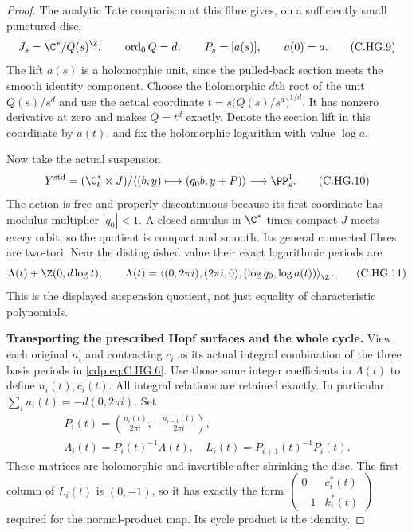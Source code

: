 \begin{proof}
The analytic Tate comparison at this fibre
gives, on a sufficiently small punctured disc,
\[
       J_s=\C^*/Q(s)^{\Z},\qquad
       \operatorname{ord}_0Q=d,\qquad P_s=[a(s)],
       \qquad a(0)=a.
\tag{C.HG.9}\label{cdp:eq:C.HG.9}
\]
The lift $a(s)$ is a holomorphic unit, since
the pulled-back section meets the smooth
identity component. Choose the holomorphic
$d$th root of the unit $Q(s)/s^d$ and use the
actual coordinate
$t=s\bigl(Q(s)/s^d\bigr)^{1/d}$.
It has nonzero derivative at zero and makes
$Q=t^d$ exactly. Denote the section lift in
this coordinate by $a(t)$, and fix the
holomorphic logarithm with value $\log a$.

Now take the actual suspension
\[
 Y^{\rm std}=
  (\C^*_b\times J)/
      \langle(b,y)\longmapsto(q_0 b,y+P)\rangle
          \longrightarrow\PP^1_s .
\tag{C.HG.10}\label{cdp:eq:C.HG.10}
\]
The action is free and properly discontinuous
because its first coordinate has modulus
multiplier $|q_0|<1$. A closed annulus in
$\C^*$ times compact $J$ meets every orbit,
so the quotient is compact and smooth.
Its general connected fibres are two-tori.
Near the distinguished value their exact
logarithmic periods are
\[
 \Lambda(t)+\Z(0,d\log t),\qquad
 \Lambda(t)=
 \left\langle(0,2\pi i),(2\pi i,0),
                  (\log q_0,\log a(t))\right\rangle_{\Z}.
\tag{C.HG.11}\label{cdp:eq:C.HG.11}
\]
This is the displayed suspension quotient,
not just equality of characteristic polynomials.

\par\medskip\noindent\textbf{Transporting the prescribed Hopf surfaces and the whole cycle.}
View each original $n_i$ and contracting
$c_i$ as its actual integral combination
of the three basis periods in \eqref{cdp:eq:C.HG.6}.
Use those same integer coefficients in
$\Lambda(t)$ to define $n_i(t),c_i(t)$.
All integral relations are retained exactly.
In particular $\sum_i n_i(t)=-d(0,2\pi i)$.
Set
\[
 \begin{gathered}
 P_i(t)=\left(\frac{n_i(t)}{2\pi i},
                    -\frac{n_{i-1}(t)}{2\pi i}\right),\\
 \Lambda_i(t)=P_i(t)^{-1}\Lambda(t),
 \quad L_i(t)=P_{i+1}(t)^{-1}P_i(t).
 \end{gathered}
\tag{C.HG.12}\label{cdp:eq:C.HG.12}
\]
These matrices are holomorphic and invertible
after shrinking the disc. The first column
of $L_i(t)$ is $(0,-1)$, so it has exactly the
form
$\left(\begin{smallmatrix}0&c_i^*(t)\\-1&k_i^*(t)\end{smallmatrix}\right)$
required for the normal-product map.
Its cycle product is the identity.


\end{proof}
